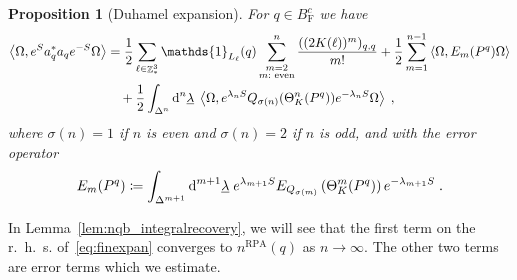 \documentclass[12pt,a4paper]{article}
\numberwithin{equation}{section}
\newcommand{\1}{\mathbb{I}}
\newcommand{\di}{\textnormal{d}}
\newcommand{\F}{\mathrm{F}}
\newcommand{\RPA}{\mathrm{RPA}}
\DeclareMathOperator{\Z}{\mathbb{Z}}
\newcommand{\half}{\frac{1}{2}}
\newcommand{\eva}[1]{\left\langle #1 \right\rangle}
\theoremstyle{plain}
\newtheorem{proposition}[theorem]{Proposition}
\theoremstyle{definition}
\theoremstyle{remark}
\theoremstyle{plain}
\theoremstyle{definition}
\theoremstyle{remark}
\begin{document}
\begin{proposition}[Duhamel expansion]\label{prop:finexpan}
For $q \in B^c_{\F}$ we have
\begin{align} \label{eq:finexpan}
	\eva{\Omega, e^{S} a_q^* a_q e^{-S} \Omega} 
	&= \half\sum_{\ell\in \Z^3_*}\mathds{1}_{L_\ell}(q) \sum_{\substack{m=2\\m:\textnormal{ even}}}^n \frac{((2K(\ell))^m)_{q,q}}{m!}
		+ \half \sum_{m=1}^{n-1} \eva{\Omega, E_m(P^q)\Omega}\nonumber\\
	&\quad +\half \int_{\Delta^n} \di^n\underline{\lambda} \;
		\eva{\Omega, e^{\lambda_n S}Q_{\sigma(n)}(\Theta^n_{K}(P^q)) e^{-\lambda_n S} \Omega} \;,
\end{align}
where $ \sigma(n) = 1 $ if $ n $ is even and $ \sigma(n) = 2 $ if $n$ is odd, and with the error operator
\begin{equation}\label{eq:errEm}
	E_m(P^q) \coloneq \int_{\Delta^{m+1}} \di^{m+1} \underline{\lambda} \;
		e^{\lambda_{m+1} S} E_{Q_{\sigma(m)}}\left(\Theta^{m}_{K}(P^q)\right) e^{-\lambda_{m+1} S} \;.
\end{equation}
\end{proposition}

In Lemma~\ref{lem:nqb_integralrecovery}, we will see that the first term on the r.~h.~s. of~\eqref{eq:finexpan} converges to $ n^{\RPA}(q) $ as $ n \to \infty $. The other two terms are error terms which we estimate.
\end{document}
